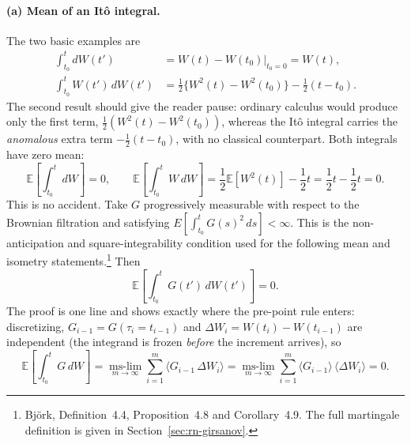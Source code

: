 \paragraph{(a) Mean of an It\^o integral.}
The two basic examples are
\begin{equation}\begin{split}
\int_{t_0}^{t} dW(t') &= W(t)-W(t_0)\big|_{t_0=0} = W(t),\\
\int_{t_0}^{t} W(t')\,dW(t') &= \frac{1}{2}\big\{W^2(t)-W^2(t_0)\big\} - \frac{1}{2}(t-t_0).
\end{split}\end{equation}
The second result should give the reader pause: ordinary calculus would produce only the first term, $\tfrac12(W^2(t)-W^2(t_0))$, whereas the It\^o integral carries the \emph{anomalous} extra term $-\tfrac{1}{2}(t-t_0)$, with no classical counterpart.
Both integrals have zero mean:
\begin{equation}
\mathbb{E}\!\left[\int_{t_0}^t dW\right]=0,\qquad
\mathbb{E}\!\left[\int_{t_0}^t W\,dW\right] = \frac{1}{2}\mathbb{E}[W^2(t)] - \frac{1}{2}t = \frac{1}{2}t - \frac{1}{2}t = 0.
\end{equation}
This is no accident.
Take $G$ progressively measurable with respect to the Brownian filtration and satisfying $E[\int_{t_0}^t G(s)^2\,ds]<\infty$.
This is the non-anticipation and square-integrability condition used for the following mean and isometry statements.\footnote{Bj\"ork\cite{Bjork2020}, Definition~4.4, Proposition~4.8 and Corollary~4.9.
The full martingale definition is given in Section~\ref{sec:rn-girsanov}.}
Then
\begin{equation}
\mathbb{E}\!\left[\int_{t_0}^{t} G(t')\,dW(t')\right] = 0.
\end{equation}
The proof is one line and shows exactly where the pre-point rule enters: discretizing, $G_{i-1}=G(\tau_i=t_{i-1})$ and $\Delta W_i=W(t_i)-W(t_{i-1})$ are independent (the integrand is frozen \emph{before} the increment arrives), so
\begin{equation}
\mathbb{E}\!\left[\int_{t_0}^t G\,dW\right] = \operatorname*{ms\text{-}lim}_{m\to\infty}\sum_{i=1}^{m}\langle G_{i-1}\,\Delta W_i\rangle = \operatorname*{ms\text{-}lim}_{m\to\infty}\sum_{i=1}^{m}\langle G_{i-1}\rangle\,\langle\Delta W_i\rangle = 0.
\end{equation}

